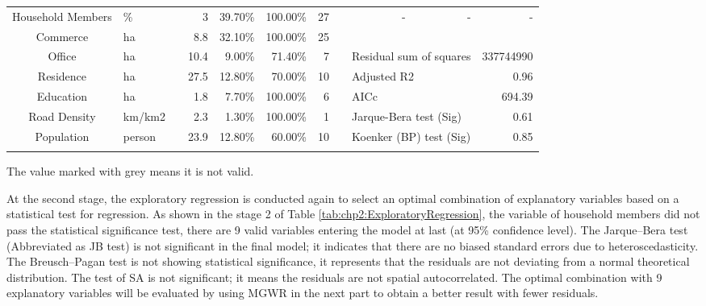 \begin{sidewaystable}[htbp]
\begin{tabular}{clrrrrrcrrr}
		Household Members & \% & & 3 & 39.70\% & 100.00\% & 27 & & - & - & - \\
		
		\cmidrule{1-2}\cmidrule{4-7}\cmidrule{9-11}
		
		Commerce & ha & & \cellcolor[rgb]{ .8,  .8,  .8}8.8 & 32.10\% & 100.00\% & 25 & & &  \\
		
		Office & ha & & \cellcolor[rgb]{ .8,  .8,  .8}10.4 & \cellcolor[rgb]{ .8,  .8,  .8}9.00\% & \cellcolor[rgb]{ .8,  .8,  .8}71.40\% & 7 & & \multicolumn{2}{l}{Residual sum of squares} & 337744990 \\
		
		Residence & ha & & \cellcolor[rgb]{ .8,  .8,  .8}27.5 & 12.80\% & \cellcolor[rgb]{ .8,  .8,  .8}70.00\% & 10 & & \multicolumn{2}{l}{Adjusted R2} & 0.96 \\
		
		Education & ha & & 1.8 & \cellcolor[rgb]{ .8,  .8,  .8}7.70\% & 100.00\% & 6 & & \multicolumn{2}{l}{AICc} & 694.39 \\
		
		Road Density & km/km2 & & 2.3 & \cellcolor[rgb]{ .8,  .8,  .8}1.30\% & 100.00\% & 1 & & \multicolumn{2}{l}{Jarque-Bera test (Sig)} & 0.61 \\
		
		Population & person & & \cellcolor[rgb]{ .8,  .8,  .8}23.9 & 12.80\% & \cellcolor[rgb]{ .8,  .8,  .8}60.00\% & 10 & & \multicolumn{2}{l}{Koenker (BP) test (Sig)} & 0.85 \\
		
		\Xhline{1.5pt}
	\end{tabular}%
	\normalsize
	\begin{description}
		\label{note:tab:chp2:ExploratoryRegression}
		\item[Note:]
		The value marked with grey means it is not valid.
	\end{description}
\end{sidewaystable}%

%
At the second stage, the exploratory regression is conducted again to select an optimal combination of explanatory variables based on a statistical test for regression. As shown in the stage 2 of Table \ref{tab:chp2:ExploratoryRegression}, the variable of household members did not pass the statistical significance test, there are 9 valid variables entering the model at last (at 95\% confidence level). The Jarque–Bera test (Abbreviated as JB test) is not significant in the final model; it indicates that there are no biased standard errors due to heteroscedasticity. The Breusch–Pagan test is not showing statistical significance, it represents that the residuals are not deviating from a normal theoretical distribution. The test of SA is not significant; it means the residuals are not spatial autocorrelated. The optimal combination with 9 explanatory variables will be evaluated by using MGWR in the next part to obtain a better result with fewer residuals.

